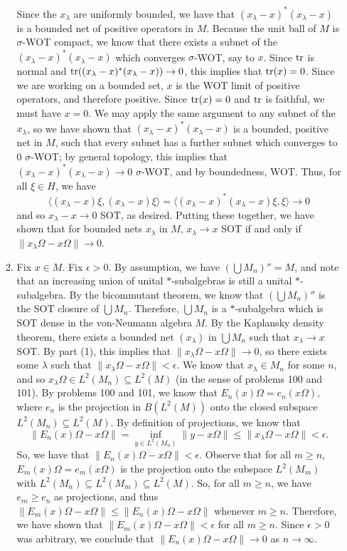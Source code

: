 \documentclass[a4paper,10pt]{report}
\begin{document}
\begin{enumerate}
\begin{enumerate}
				Since the $x_\lambda$ are uniformly bounded, we have that $(x_\lambda - x)^*(x_\lambda - x)$ is a bounded net of positive operators in $M$. 
				Because the unit ball of $M$ is $\sigma$-WOT compact, we know that there exists a subnet of the $(x_\lambda - x)^*(x_\lambda - x)$ which converges $\sigma$-WOT, say to $x$.  Since $\operatorname{tr}$ is normal and $\operatorname{tr}((x_\lambda - x)^*(x_\lambda - x)) \rightarrow 0$, this implies that $\operatorname{tr}(x) = 0$.  
				Since we are working on a bounded set, $x$ is the WOT limit of positive operators, and therefore positive. 
				Since $\operatorname{tr}(x)=0$ and $\operatorname{tr}$ is faithful, we must have $x=0$. 
				We may apply the same argument to any subnet of the $x_\lambda$, so we have shown that $(x_\lambda - x)^*(x_\lambda - x)$ is a bounded, positive net in $M$, such that every subnet has a further subnet which converges to $0$ $\sigma$-WOT; by general topology, this implies that $(x_\lambda-x)^*(x_\lambda-x)\to 0$ $\sigma$-WOT, and by boundedness, WOT. 
			 Thus, for all $\xi\in H$, we have $$\langle (x_\lambda - x)\xi, (x_\lambda - x)\xi \rangle = \langle (x_\lambda - x)^*(x_\lambda - x)\xi,\xi \rangle \rightarrow 0$$ and so $x_\lambda - x \rightarrow 0$ SOT, as desired. 
			\newline
			\newline Putting these together, we have shown that for bounded nets $x_\lambda$ in $M$, $x_\lambda \rightarrow x$ SOT if and only if $\|x_\lambda \Omega - x\Omega\| \rightarrow 0$.
			\item Fix $x\in M$.  Fix $\epsilon > 0$.  By assumption, we have $(\bigcup{M_n})'' = M$, and note that an increasing union of unital $*$-subalgebras is still a unital $*$-subalgebra. 
				By the bicommutant theorem, we know that $(\bigcup{M_n})''$ is the SOT closure of $\bigcup{M_n}$.  Therefore, $\bigcup{M_n}$ is a $*$-subalgebra which is SOT dense in the von-Neumann algebra $M$. By the Kaplansky density theorem, there exists a bounded net $(x_\lambda)$ in $\bigcup{M_n}$ such that $x_\lambda \rightarrow x$ SOT.  By part (1), this implies that $\|x_\lambda \Omega - x\Omega\| \rightarrow 0$, so there exists some $\lambda$ such that $\|x_\lambda \Omega - x\Omega\| < \epsilon$.  We know that $x_\lambda \in M_n$ for some $n$, and so $x_\lambda \Omega \in L^2(M_n) \subseteq L^2(M)$ (in the sense of problems 100 and 101).  By problems 100 and 101, we know that $E_n(x)\Omega = e_n (x\Omega)$, where $e_n$ is the projection in $B(L^2(M))$ onto the closed subspace $L^2(M_n)\subseteq L^2(M)$. By definition of projections, we know that $$\|E_n(x)\Omega - x\Omega \| = \inf_{y\in L^2(M_n)}{\|y - x\Omega\|} \leq \|x_\lambda \Omega - x\Omega\| < \epsilon.$$ So, we have that $\|E_n(x)\Omega - x\Omega \| < \epsilon$.  Observe that for all $m\geq n$, $E_m(x)\Omega = e_m(x\Omega)$ is the projection onto the subspace $L^2(M_m)$ with $L^2(M_n)\subseteq L^2(M_m)\subseteq L^2(M)$.  So, for all $m\geq n$, we have $e_m\geq e_n$ as projections, and thus $\|E_m(x)\Omega - x\Omega \| \leq \|E_n(x)\Omega - x\Omega \|$ whenever $m\geq n$.  Therefore, we have shown that $\|E_m(x)\Omega - x\Omega \| < \epsilon$ for all $m\geq n$.  Since $\epsilon > 0$ was arbitrary, we conclude that $\|E_n(x)\Omega - x\Omega\| \rightarrow 0$ as $n\rightarrow \infty$.

\end{enumerate}
\end{enumerate}
\end{document}
